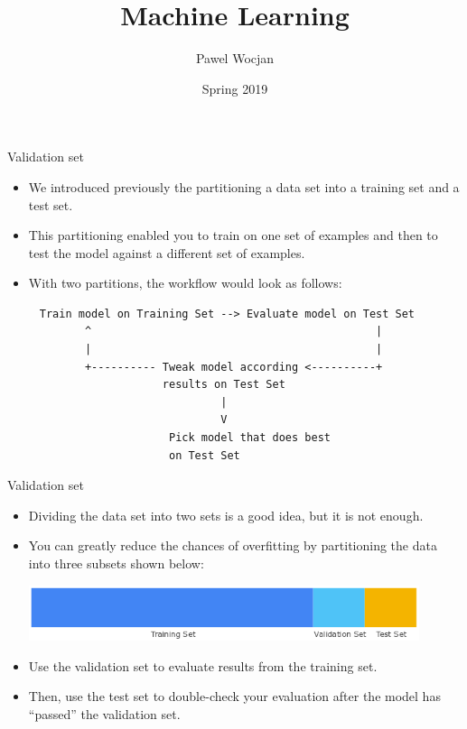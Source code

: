 \documentclass{beamer}
\title[ML]{Machine Learning}
\author{Pawel Wocjan}
\institute{University of Central Florida}
\date{Spring 2019}
\begin{document}
\begin{frame}
  \titlepage
\end{frame}

\begin{frame}[fragile]{Validation set}

\begin{itemize}
\item We introduced previously the partitioning a data set into a training set and a test set. 
\item This partitioning enabled you to train on one set of examples and then to test the model against a different set of examples. 
\item With two partitions, the workflow would look as follows:
\end{itemize}

{\footnotesize
\begin{verbatim}
     Train model on Training Set --> Evaluate model on Test Set
            ^                                            |
            |                                            |
            +---------- Tweak model according <----------+
                        results on Test Set
                                 |
                                 V
                         Pick model that does best
                         on Test Set
\end{verbatim}
}
\end{frame}

\begin{frame}{Validation set}
\begin{itemize}
\item Dividing the data set into two sets is a good idea, but it is not enough. 
\item You can greatly reduce the chances of overfitting by partitioning the data into three subsets shown below:

\medskip
\includegraphics[width=0.9\textwidth]{images/PartitionThreeSets.png}

\item Use the validation set to evaluate results from the training set. 
\item Then, use the test set to double-check your evaluation after the model has ``passed'' the validation set.
\end{itemize}
\end{frame}
\end{document}
